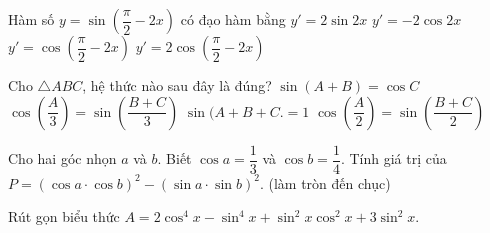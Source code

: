 \begin{ex}%
	Hàm số $y = \sin \left( {\dfrac{\pi }{2}  - 2x} \right)$ có đạo hàm bằng \vspace{3pt}
	\choice 
		{$y' = 2\sin  2x$}
		{\True $y'  = - 2\cos 2x$}
		{$y' = \cos \left( {\dfrac{\pi  }{2} - 2x} \right)$}
		{$y' = 2\cos \left( {\dfrac{\pi }{2} - 2x} \right)$} 
\end{ex}

\begin{ex}%
	Cho  $\triangle ABC$, hệ thức nào sau đây là đúng?
	\choice 
		{$\sin  (A+B)=\cos C$}
		{$\cos \left(\dfrac{A}{3} \right)=\sin \left(\dfrac{B+C}{3}  \right)$}
		 {$\sin (A+B+C.=1$}
		 {\True $\cos \left(\dfrac{A}{2} \right)=\sin \left(\dfrac{B+C}{2} \right)$}
\end{ex}

\begin{ex}%
	Cho hai góc nhọn $a$ và $b$. Biết $\cos a=\dfrac{1}{3}$ và $\cos b=\dfrac{1}{4}$. Tính giá trị của 
	$P=(\cos a\cdot\cos b)^2-(\sin a\cdot\sin  b)^2 .$ (làm tròn đến chục)
\end{ex}

\begin{ex}%
	Rút gọn biểu thức  $A=2\cos ^4x-\sin ^4x+\sin ^2x\cos ^2x+3\sin ^2x$.
\end{ex}

